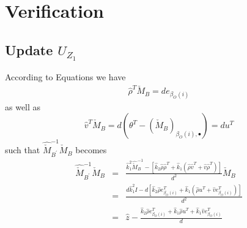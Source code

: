 \documentclass[a4paper]{article}
\begin{document}
\section{Verification}
\subsection{Update $U_{Z_{1}}$}
According to Equations  we have
\begin{eqnarray}
\hat{\rho}^{T}\check{M}_{B}=de_{\beta_{O}(i)}
\end{eqnarray}
as well as 
\begin{equation}
\hat{v}^{T}\check{M}_{B}=
d\left(\theta^{T} 
   -\left(\check{M}_{B}\right)_{\beta_{O}(i), \bullet}
 \right)
=
du^{T}
\end{equation}
such that $\hat{\check{M}}_{B^{\prime}}^{-1}\check{M}_{B}$ becomes
\begin{eqnarray}
\hat{\check{M}}_{B^{\prime}}^{-1}
\check{M}_{B}
&=&
\frac{
\hat{k}_{1}^{2}\hat{\check{M}}_{B}^{-1}
-\left[
  \hat{k}_{2}\hat{\rho}\hat{\rho}^{T}
  +\hat{k}_{1}\left(\hat{\rho}\hat{v}^{T} +\hat{v}\hat{\rho}^{T}\right)
 \right]
}{d^{2}}
\check{M}_{B}
\nonumber \\
&=&
\frac{
  d\hat{k}_{1}^{2}I
  -d
  \left[
    \hat{k}_{2}\hat{\rho}e_{\beta_{O}(i)}^{T}
    +\hat{k}_{1}
    \left(
      \hat{\rho}u^{T}
      +\hat{v}e_{\beta_{O}(i)}^{T}
    \right)
  \right]
}{d^{2}}
\nonumber \\
&=&
\hat{z}
-\frac{
  \hat{k}_{2}\hat{\rho}e_{\beta_{O}(i)}^{T}
  +\hat{k}_{1}\hat{\rho}u^{T}
  +\hat{k}_{1}\hat{v}e_{\beta_{O}(i)}^{T}
}{d}
\end{eqnarray}
\end{document}
